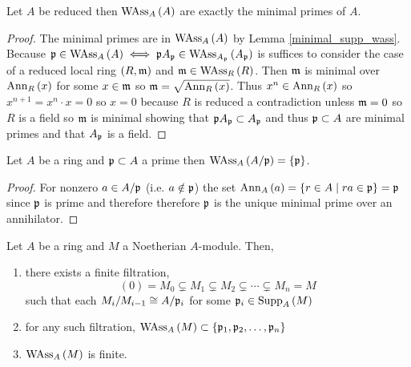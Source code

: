 \documentclass[12pt]{article}
\begin{document}
\begin{prop}
Let $A$ be reduced then $\mathrm{WAss}_{A}\left(A \right)$ are exactly the minimal primes of $A$.
\end{prop}

\begin{proof}
The minimal primes are in $\mathrm{WAss}_{A}\left(A \right)$ by Lemma \ref{minimal_supp_wass}. Because $\mathfrak{p} \in \mathrm{WAss}_{A}\left(A \right) \iff \mathfrak{p} A_{\mathfrak{p}} \in \mathrm{WAss}_{A_{\mathfrak{p}}}\left(A_{\mathfrak{p}} \right)$ is suffices to consider the case of a reduced local ring $(R, \mathfrak{m})$ and $\mathfrak{m} \in \mathrm{WAss}_{R}\left(R \right)$. Then $\mathfrak{m}$ is minimal over $\mathrm{Ann}_{R}\left(x\right)$ for some $x \in \mathfrak{m}$ so $\mathfrak{m} = \sqrt{\mathrm{Ann}_{R}\left(x\right)}$. Thus $x^n \in \mathrm{Ann}_{R}\left(x\right)$ so $x^{n+1} = x^n \cdot x = 0$ so $x = 0$ because $R$ is reduced a contradiction unless $\mathfrak{m} = 0$ so $R$ is a field so $\mathfrak{m}$ is minimal showing that $\mathfrak{p} A_{\mathfrak{p}} \subset A_{\mathfrak{p}}$ and thus $\mathfrak{p} \subset A$ are minimal primes and that $A_{\mathfrak{p}}$ is a field. 
\end{proof}

\begin{lemma}
Let $A$ be a ring and $\mathfrak{p} \subset A$ a prime then $\mathrm{WAss}_{A}\left(A / \mathfrak{p} \right) = \{ \mathfrak{p} \}$. 
\end{lemma}

\begin{proof}
For nonzero $a \in A / \mathfrak{p}$ (i.e. $a \notin \mathfrak{p}$) the set $\mathrm{Ann}_{A}\left(a\right) = \{ r \in A \mid ra \in \mathfrak{p} \} = \mathfrak{p}$ since $\mathfrak{p}$ is prime and therefore therefore $\mathfrak{p}$ is the unique minimal prime over an annihilator.
\end{proof}

\begin{proposition} \label{noetherian_finite_wass}
Let $A$ be a ring and $M$ a Noetherian $A$-module. Then,
\begin{enumerate}
\item there exists a finite filtration,
\[ (0) = M_0 \subsetneq M_1 \subsetneq M_2 \subsetneq \cdots \subsetneq M_n = M \]
such that each $M_{i} / M_{i-1} \cong A / \mathfrak{p}_{i}$ for some $\mathfrak{p}_i \in \mathrm{Supp}_{A} \left( M \right)$
\item for any such filtration, $\mathrm{WAss}_{A}\left(M \right) \subset \{ \mathfrak{p}_1, \mathfrak{p}_2, \dots, \mathfrak{p}_n\}$
\item $\mathrm{WAss}_{A}\left(M \right)$ is finite.
\end{enumerate}
\end{proposition}
\end{document}

